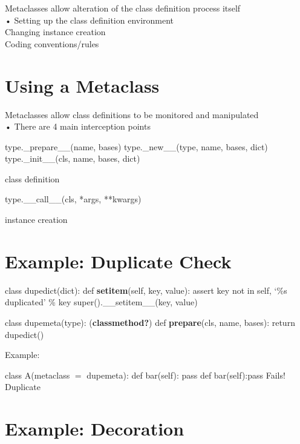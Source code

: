 \documentclass[
  letterpaper,
  DIV=11,
  numbers=noendperiod]{scrreprt}
\newenvironment{Shaded}{\begin{snugshade}}{\end{snugshade}}
\newcommand{\BuiltInTok}[1]{\textcolor[rgb]{0.00,0.23,0.31}{#1}}
\newcommand{\NormalTok}[1]{\textcolor[rgb]{0.00,0.23,0.31}{#1}}
\begin{document}
Metaclasses allow alteration of the class definition process itself\\
• Setting up the class definition environment\\
Changing instance creation\\
Coding conventions/rules


\chapter{Using a Metaclass}\label{using-a-metaclass-1}

Metaclasses allow class definitions to be monitored and manipulated\\
• There are 4 main interception points

\begin{Shaded}
\begin{Highlighting}[]
\BuiltInTok{type}\NormalTok{.\_prepare\_\_(name, bases)  }
\BuiltInTok{type}\NormalTok{.\_new\_\_(}\BuiltInTok{type}\NormalTok{, name, bases, }\BuiltInTok{dict}\NormalTok{)  }
\BuiltInTok{type}\NormalTok{.\_init\_\_(cls, name, bases, }\BuiltInTok{dict}\NormalTok{) }
\end{Highlighting}
\end{Shaded}

class definition

type.\_\_call\_\_(cls, *args, **kwargs)

instance creation


\chapter{Example: Duplicate Check}\label{example-duplicate-check}

class dupedict(dict): def \textbf{setitem}(self, key, value): assert key
not in self, `\%s duplicated' \% key super().\_\_setitem\_\_(key, value)

class dupemeta(type): (\textbf{classmethod?}) def \textbf{prepare}(cls,
name, bases): return dupedict()

Example:

class A(metaclass \(=\) dupemeta): def bar(self): pass def
bar(self):pass Fails! Duplicate


\chapter{Example: Decoration}\label{example-decoration}
\end{document}
